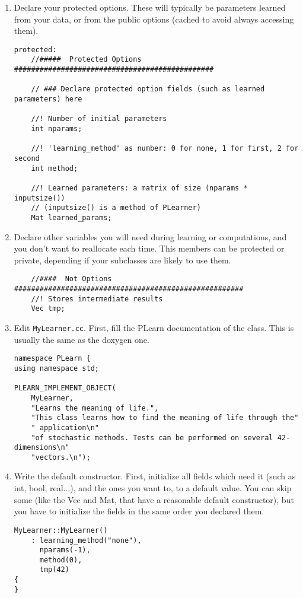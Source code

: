 \documentclass[11pt]{book}
\begin{document}
\begin{enumerate}
\item Declare your protected options. These will typically be parameters
learned from your data, or from the public options (cached to avoid
always accessing them).
\begin{verbatim}
protected:
    //#####  Protected Options  ###############################################

    // ### Declare protected option fields (such as learned parameters) here

    //! Number of initial parameters
    int nparams;

    //! 'learning_method' as number: 0 for none, 1 for first, 2 for second
    int method;

    //! Learned parameters: a matrix of size (nparams * inputsize())
    // (inputsize() is a method of PLearner)
    Mat learned_params;
\end{verbatim}

\item Declare other variables you will need during learning or
computations, and you don't want to reallocate each time. This members
can be protected or private, depending if your subclasses are likely to
use them.
\begin{verbatim}
    //####  Not Options  ######################################################
    //! Stores intermediate results
    Vec tmp;
\end{verbatim}

\item Edit {\tt MyLearner.cc}. First, fill the PLearn documentation of
the class. This is usually the same as the doxygen one.
\begin{verbatim}
namespace PLearn {
using namespace std;

PLEARN_IMPLEMENT_OBJECT(
    MyLearner,
    "Learns the meaning of life.",
    "This class learns how to find the meaning of life through the"
    " application\n"
    "of stochastic methods. Tests can be performed on several 42-dimensions\n"
    "vectors.\n");
\end{verbatim}

\item Write the default constructor. First, initialize all fields which
need it (such as int, bool, real...), and the ones you want to, to a
default value. You can skip some (like the Vec and Mat, that have a
reasonable default constructor), but you have to initialize the fields
in the same order you declared them.
\begin{verbatim}
MyLearner::MyLearner()
    : learning_method("none"),
      nparams(-1),
      method(0),
      tmp(42)
{
}
\end{verbatim}


\end{enumerate}
\end{document}
